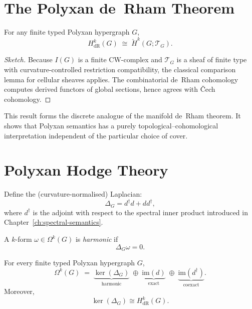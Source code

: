\section{The Polyxan de~Rham Theorem}

\begin{theorem}
\label{thm:polyx-derham}
For any finite typed Polyxan hypergraph $G$,
\[
H^k_{\mathrm{dR}}(G)
\;\cong\;
\check{H}^k(G;\mathscr{T}_G).
\]
\end{theorem}

\begin{proof}[Sketch]
Because $I(G)$ is a finite CW-complex and $\mathscr{T}_G$ is a sheaf of finite
type with curvature-controlled restriction compatibility, the classical
comparison lemma for cellular sheaves applies.  
The combinatorial de~Rham cohomology computes derived functors of global
sections, hence agrees with Čech cohomology.
\end{proof}

This result forms the discrete analogue of the manifold de~Rham theorem.
It shows that Polyxan semantics has a purely topological–cohomological
interpretation independent of the particular choice of cover.

\section{Polyxan Hodge Theory}

Define the (curvature-normalised) Laplacian:
\[
\Delta_G = d^\dagger d + d d^\dagger,
\]
where $d^\dagger$ is the adjoint with respect to the spectral inner product
introduced in Chapter~\ref{ch:spectral-semantics}.

\begin{definition}
A $k$-form $\omega\in\Omega^k(G)$ is \emph{harmonic} if
\[
\Delta_G \omega = 0.
\]
\end{definition}

\begin{theorem}
\label{thm:polyx-hodge}
For every finite typed Polyxan hypergraph $G$,
\[
\Omega^k(G)
   \;=\;
\underbrace{\ker(\Delta_G)}_{\text{harmonic}}
\;\oplus\;
\underbrace{\mathrm{im}(d)}_{\text{exact}}
\;\oplus\;
\underbrace{\mathrm{im}(d^\dagger)}_{\text{coexact}}.
\]
Moreover,
\[
\ker(\Delta_G)\cong H^k_{\mathrm{dR}}(G).
\]
\end{theorem}

